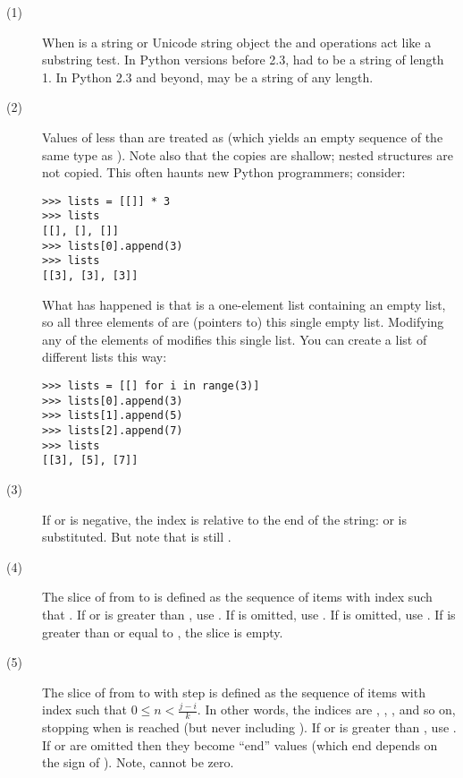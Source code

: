 \begin{description}
\item[(1)] When  is a string or Unicode string object the
 and  operations act like a substring test.  In
Python versions before 2.3,  had to be a string of length 1.
In Python 2.3 and beyond,  may be a string of any length.

\item[(2)] Values of  less than  are treated as
   (which yields an empty sequence of the same type as
  ).  Note also that the copies are shallow; nested structures
  are not copied.  This often haunts new Python programmers; consider:

\begin{verbatim}
>>> lists = [[]] * 3
>>> lists
[[], [], []]
>>> lists[0].append(3)
>>> lists
[[3], [3], [3]]
\end{verbatim}

  What has happened is that \code{[[]]} is a one-element list containing
  an empty list, so all three elements of  are (pointers to)
  this single empty list.  Modifying any of the elements of 
  modifies this single list.  You can create a list of different lists this
  way:

\begin{verbatim}
>>> lists = [[] for i in range(3)]
>>> lists[0].append(3)
>>> lists[1].append(5)
>>> lists[2].append(7)
>>> lists
[[3], [5], [7]]
\end{verbatim}

\item[(3)] If  or  is negative, the index is relative to
  the end of the string:  or
   is substituted.  But note that  is
  still .

\item[(4)] The slice of  from  to  is defined as
  the sequence of items with index  such that .  If  or  is greater than
  , use .  If  is omitted,
  use .  If  is omitted, use .  If
   is greater than or equal to , the slice is empty.

\item[(5)] The slice of  from  to  with step
   is defined as the sequence of items with index 
   such that
  $0 \leq n < \frac{j-i}{k}$.  In other words, the indices
  are , , ,  and so on, stopping when
   is reached (but never including ).  If  or 
  is greater than , use .  If
   or  are omitted then they become ``end'' values
  (which end depends on the sign of ).  Note,  cannot
  be zero.


\end{description}
